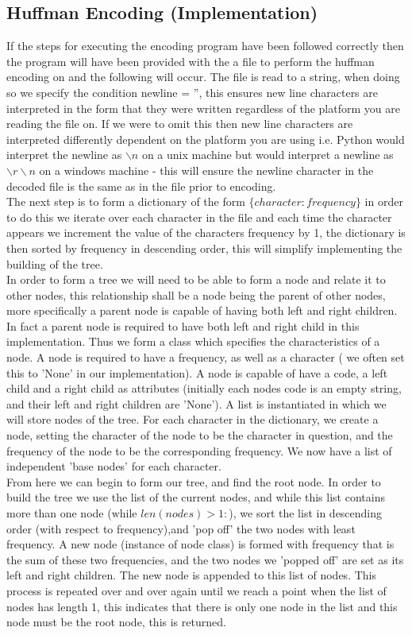 \documentclass{mm2}
\begin{document}
\subsection{Huffman Encoding (Implementation)}
If the steps for executing the encoding program have been followed correctly then the program will have been provided with the a file to perform the huffman encoding on and the following will occur. The  file is read to a string, when doing so we specify the condition newline = '', this ensures new line characters are interpreted in the form that they were written regardless of the platform you are reading the file on. If we were to omit this then new line characters are interpreted differently dependent on the platform you are using i.e. Python would interpret the newline as $\backslash n$ on a unix machine but would interpret a newline as $\backslash r \backslash n$ on a windows machine - this will ensure the newline character in the decoded file is the same as in the file prior to encoding.\\
The next step is to form a dictionary of the form $\{ character : frequency \}$ in order to do this we iterate over each character in the file and each time the character appears we increment the value of the characters frequency by 1, the dictionary is then sorted by frequency in descending order, this will simplify implementing the building of the tree.\\
In order to form a tree we will need to be able to form a node and relate it to other nodes, this relationship shall be a node being the parent of other nodes, more specifically a parent node is capable of having both left and right children. In fact a parent node is required to have both left and right child in this implementation. Thus we form a class which specifies the characteristics of a node. A node is required to have a frequency, as well as a character ( we often set this to 'None' in our implementation). A node is capable of have a code, a left child and a right child as attributes (initially each nodes code is an empty string, and their left and right children are 'None'). A list is instantiated in which we will store nodes of the tree. For each character in the dictionary, we create a node, setting the character of the node to be the character in question, and the frequency of the node to be the corresponding frequency. We now have a list of independent 'base nodes' for each character. \\
From here we can begin to form our tree, and find the root node. In order to build the tree we use the list of the current nodes, and while this list contains more than one node ($\text{while } len(nodes)>1:$), we sort the list in descending order (with respect to frequency),and 'pop off' the two nodes with least frequency. A new node (instance of node class) is formed with frequency that is the sum of these two frequencies, and the two nodes we 'popped off' are set as its left and right children. The new node is appended to this list of nodes. This process is repeated over and over again until we reach a point when the list of nodes has length 1, this indicates that there is only one node in the list and this node must be the root node, this is returned.\\
\end{document}
